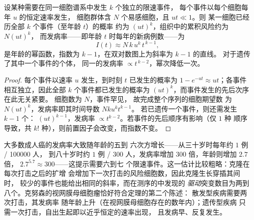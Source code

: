 \begin{theorem}[打击次数与年龄曲线]\label{thm:b3:cancer-biology:armitage-doll}
设某种需要在同一细胞谱系中发生 $k$ 个独立的限速事件，
每个事件以每个细胞每年 $u$ 的恒定速率发生，
细胞群体含 $N$ 个易感细胞，且 $ut \ll 1$。则
某一细胞已经历全部 $k$ 个事件（至年龄 $t$）的概率
约为 $(ut)^{k}$，组织中的累积风险约为 $N(ut)^{k}$，
而发病率——即年龄 $t$ 时每年的新病例数——为
\[
I(t) \approx N\,k\,u^{k}\,t^{\,k-1},
\]
是年龄的幂函数，指数为 $k - 1$，在双对数图上为斜率为 $k - 1$ 的直线。
对于遗传了其中一个事件的个体，
同一的发病率 $\propto t^{\,k-2}$，幂次降低一次。
\end{theorem}
\begin{proof}
每个事件以速率 $u$ 发生，到时刻 $t$ 已发生的概率为
$1 - e^{-ut} \approx ut$；各事件相互独立，因此全部 $k$ 个事件都已发生的概率为
$(ut)^{k}$，而事件发生的先后次序在此无关紧要。
细胞数为 $N$，事件罕见，
故完成整个序列的细胞期望数
为 $N(ut)^{k}$，发病率即其时间导数 $Nku^{k}t^{k-1}$。
若已遗传一个事件，则还需发生 $k - 1$ 个：
$(ut)^{k-1}$，发病率 $\propto t^{k-2}$。若事件的先后顺序有影响（仅 $1$ 种
顺序导致，共 $k!$ 种），则前置因子会改变，而指数不变。
\end{proof}

\begin{example}[读懂指数]\label{ex:b3:cancer-biology:exponent}
大多数成人癌的发病率大致随年龄的五到
六次方增长——从三十岁时每年约 $1$ 例 / \num{100000} 人，
到八十岁时约 $1$ 例 / $300$ 人，发病率增加 $300$ 倍，年龄则增加 $2.7$ 倍，
$2.7^{5.7} \approx 300$——这提示需要六到七
个限速事件。这一估计比较粗略：克隆在每次打击之后的扩增
会增加下一次打击的风险细胞数，因此克隆生长穿插其间时，
较少的事件也能给出相同的斜率，而在测序的中发现的
\emph{驱动}突变数目为两到
八个。克努森的视网膜母细胞瘤恰好符合定理的第二个陈述：
散发型疾病需要两次打击，其发病率
随年龄上升（在视网膜母细胞存在的数年内）；遗传型疾病
只需一次打击，自出生起即以近乎恒定的速率出现，
且发病早、反复发生。
\end{example}

